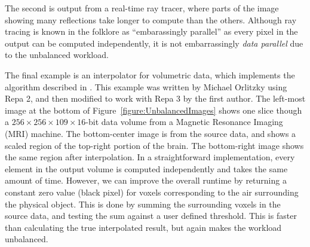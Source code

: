 The second is output from a real-time ray tracer, where parts of the image showing many reflections take longer to compute than the others. Although ray tracing is known in the folklore as ``embarassingly parallel'' as every pixel in the output can be computed independently, it is not embarrassingly \emph{data parallel} due to the unbalanced workload.

The final example is an interpolator for volumetric data, which implements the algorithm described in \cite{Sorokina:Spline}. This example was written by Michael Orlitzky using Repa 2, and then modified to work with Repa 3 by the first author. The left-most image at the bottom of Figure~\ref{figure:UnbalancedImages} shows one slice though a $256 \times 256 \times 109 \times 16$-bit data volume from a Magnetic Resonance Imaging (MRI) machine. The bottom-center image is from the source data, and shows a scaled region of the top-right portion of the brain. The bottom-right image shows the same region after interpolation. In a straightforward implementation, every element in the output volume is computed independently and takes the same amount of time. However, we can improve the overall runtime by returning a constant zero value (black pixel) for voxels corresponding to the air surrounding the physical object. This is done by summing the surrounding voxels in the source data, and testing the sum against a user defined threshold. This is faster than calculating the true interpolated result, but again makes the workload unbalanced.


